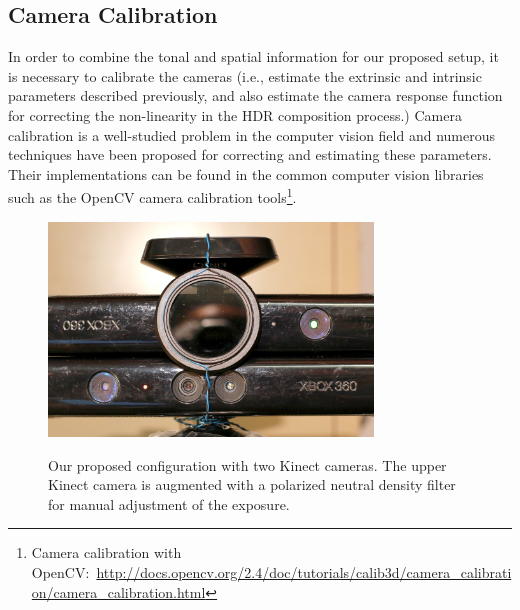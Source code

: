 \subsection{Camera Calibration}
In order to combine the tonal and spatial information for our proposed setup, it is necessary to 
calibrate the cameras (i.e., estimate the extrinsic and intrinsic parameters described previously, 
and also estimate the camera response function for correcting the non-linearity in the HDR 
composition process.) Camera calibration is a well-studied problem in the computer vision field and 
numerous techniques have been proposed \cite{zhang2000flexible, mannist, 
robertson2003estimation} for correcting and estimating these parameters. Their implementations 
can be found in the common computer vision libraries such as the OpenCV camera calibration 
tools\footnote{Camera calibration with OpenCV:~\url{http://docs.opencv.org/2.4/doc/tutorials/calib3d/camera_calibration/camera_calibration.html}}.\begin{figure}
\centering\includegraphics[width=3.4in]{ch4/diagrams/kinect_closeup} \\\caption{Our proposed 
configuration with two Kinect cameras. The upper Kinect camera is augmented with a polarized 
neutral density filter for manual adjustment of the exposure.}\label{fig_multiple_camera}\end{figure}



